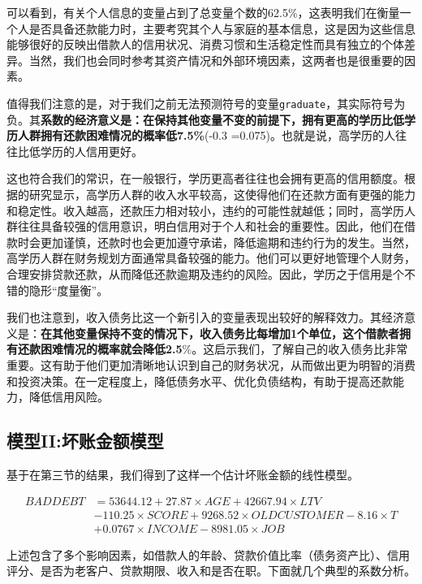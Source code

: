 \documentclass[13.5pt,hyperref,a4paper,UTF8]{ctexart}
\begin{document}
可以看到，有关个人信息的变量占到了总变量个数的62.5\%，这表明我们在衡量一个人是否具备还款能力时，主要考究其个人与家庭的基本信息，这是因为这些信息能够很好的反映出借款人的信用状况、消费习惯和生活稳定性而具有独立的个体差异。当然，我们也会同时参考其资产情况和外部环境因素，这两者也是很重要的因素。

值得我们注意的是，对于我们之前无法预测符号的变量\texttt{graduate}，其实际符号为负。其\textbf{系数的经济意义是：在保持其他变量不变的前提下，拥有更高的学历比低学历人群拥有还款困难情况的概率低7.5\%}(-0.3 =0.075)。也就是说，高学历的人往往比低学历的人信用更好。

这也符合我们的常识，在一般银行，学历更高者往往也会拥有更高的信用额度。根据\cite{基于借款人学历视角的实证检验(高学历抑制还款欠款)}的研究显示，高学历人群的收入水平较高，这使得他们在还款方面有更强的能力和稳定性。收入越高，还款压力相对较小，违约的可能性就越低；同时，高学历人群往往具备较强的信用意识，明白信用对于个人和社会的重要性。因此，他们在借款时会更加谨慎，还款时也会更加遵守承诺，降低逾期和违约行为的发生。当然，高学历人群在财务规划方面通常具备较强的能力。他们可以更好地管理个人财务，合理安排贷款还款，从而降低还款逾期及违约的风险。因此，学历之于信用是个不错的隐形“度量衡”。

我们也注意到，收入债务比这一个新引入的变量表现出较好的解释效力。其经济意义是：\textbf{在其他变量保持不变的情况下，收入债务比每增加1个单位，这个借款者拥有还款困难情况的概率就会降低2.5}\%。这启示我们，了解自己的收入债务比非常重要。这有助于他们更加清晰地认识到自己的财务状况，从而做出更为明智的消费和投资决策。在一定程度上，降低债务水平、优化负债结构，有助于提高还款能力，降低信用风险。

\subsection{模型II:坏账金额模型}

基于在第三节的结果，我们得到了这样一个估计坏账金额的线性模型。

\begin{equation}
\begin{split}
 BADDEBT &= 53644.12 + 27.87\times AGE + 42667.94\times LTV \\ & - 110.25\times SCORE + 9268.52\times OLDCUSTOMER - 8.16\times T \\ & + 0.0767\times INCOME - 8981.05\times JOB \nonumber
\end{split}
\end{equation}


上述包含了多个影响因素，如借款人的年龄、贷款价值比率（债务资产比）、信用评分、是否为老客户、贷款期限、收入和是否在职。下面就几个典型的系数分析。
\end{document}
